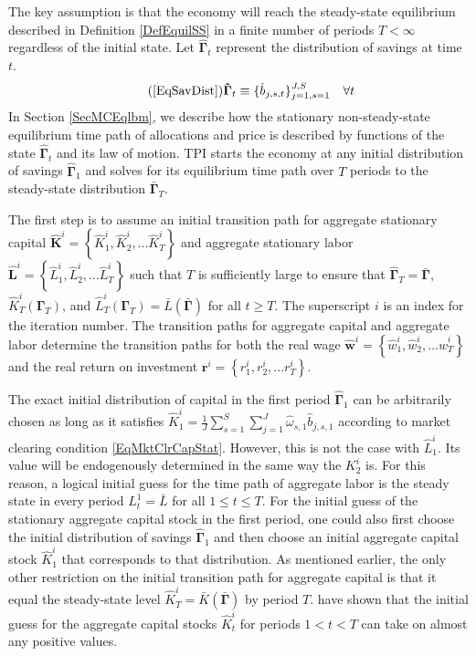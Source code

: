 \documentclass[letterpaper,12pt]{article}
\theoremstyle{definition}
\begin{document}
  The key assumption is that the economy will reach the steady-state equilibrium described in Definition \ref{DefEquilSS} in a finite number of periods $T<\infty$ regardless of the initial state. Let $\bm{\hat{\Gamma}}_t$ represent the distribution of savings at time $t$.
  \begin{equation}\tag{\ref{EqSavDist}}
    \bm{\hat{\Gamma}}_t \equiv \{\hat{b}_{j,s,t}\}_{j=1,s=1}^{J,S} \quad\forall t
  \end{equation}
  In Section \ref{SecMCEqlbm}, we describe how the stationary non-steady-state equilibrium time path of allocations and price is described by functions of the state $\bm{\hat{\Gamma}}_t$ and its law of motion. TPI starts the economy at any initial distribution of savings $\bm{\hat{\Gamma}}_1$ and solves for its equilibrium time path over $T$ periods to the steady-state distribution $\bm{\bar{\Gamma}}_T$.

  The first step is to assume an initial transition path for aggregate stationary capital $\bm{\hat{K}}^i = \left\{\hat{K}_1^i,\hat{K}_2^i,...\hat{K}_T^i\right\}$ and aggregate stationary labor $\bm{\hat{L}}^i = \left\{\hat{L}_1^i,\hat{L}_2^i,...\hat{L}_T^i\right\}$ such that $T$ is sufficiently large to ensure that $\bm{\hat{\Gamma}}_T = \bar{\bm{\Gamma}}$, $\hat{K}_T^i\left(\bm{\Gamma}_T\right)$, and $\hat{L}_T^i\left(\bm{\Gamma}_T\right) = \bar{L}\left(\bar{\bm{\Gamma}}\right)$ for all $t\geq T$. The superscript $i$ is an index for the iteration number. The transition paths for aggregate capital and aggregate labor determine the transition paths for both the real wage $\bm{\hat{w}}^i = \left\{\hat{w}_1^i,\hat{w}_2^i,...\hat{w}_T^i\right\}$ and the real return on investment $\bm{r}^i = \left\{r_1^i,r_2^i,...r_T^i\right\}$.

  The exact initial distribution of capital in the first period $\bm{\hat{\Gamma}}_1$ can be arbitrarily chosen as long as it satisfies $\hat{K}_1^i = \frac{1}{J}\sum_{s=1}^{S}\sum_{j=1}^{J}\hat{\omega}_{s,1}\hat{b}_{j,s,1}$ according to market clearing condition \eqref{EqMktClrCapStat}. However, this is not the case with $\hat{L}_1^i$. Its value will be endogenously determined in the same way the $K_2^i$ is. For this reason, a logical initial guess for the time path of aggregate labor is the steady state in every period $L_t^1 = \bar{L}$ for all $1\leq t\leq T$. For the initial guess of the stationary aggregate capital stock in the first period, one could also first choose the initial distribution of savings $\bm{\hat{\Gamma}}_1$ and then choose an initial aggregate capital stock $\hat{K}_1^i$ that corresponds to that distribution. As mentioned earlier, the only other restriction on the initial transition path for aggregate capital is that it equal the steady-state level $\hat{K}_T^i = \bar{K}\left(\bm{\bar{\Gamma}}\right)$ by period $T$. \citet{EvansPhillips:2014} have shown that the initial guess for the aggregate capital stocks $\hat{K}_t^i$ for periods $1<t<T$ can take on almost any positive values.
\end{document}
